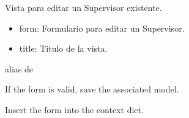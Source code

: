 \documentclass[letterpaper,10pt,spanish]{sphinxmanual}
\begin{document}
\begin{fulllineitems}

\pysigstartsignatures
{}
\pysigstopsignatures
\sphinxAtStartPar
Vista para editar un Supervisor existente.
\begin{description}
\begin{itemize}
\item {} 
\sphinxAtStartPar
form: Formulario para editar un Supervisor.

\item {} 
\sphinxAtStartPar
title: Título de la vista.

\end{itemize}

\end{description}


\begin{fulllineitems}

\pysigstartsignatures
{}
\pysigstopsignatures
\sphinxAtStartPar
alias de 

\end{fulllineitems}



\begin{fulllineitems}

\pysigstartsignatures
{}
\pysigstopsignatures
\sphinxAtStartPar
If the form is valid, save the associated model.

\end{fulllineitems}



\begin{fulllineitems}

\pysigstartsignatures
{}
\pysigstopsignatures
\sphinxAtStartPar
Insert the form into the context dict.

\end{fulllineitems}



\begin{fulllineitems}


\end{fulllineitems}
\end{fulllineitems}
\end{document}
